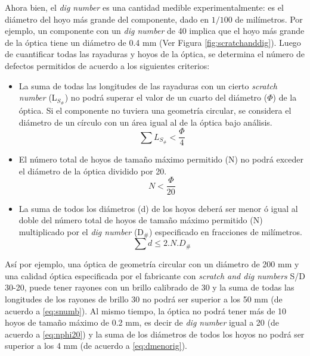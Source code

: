 Ahora bien, el \textit{dig number} es una cantidad medible experimentalmente: es el diámetro del hoyo más grande del componente, dado en $1/100$ de milímetros. Por ejemplo, un componente con un \textit{dig number} de 40 implica que el hoyo más grande de la óptica tiene un diámetro de 0.4 mm (Ver Figura \ref{fig:scratchanddig}). Luego de cuantificar todas las rayaduras y hoyos de la óptica, se determina el número de defectos permitidos de acuerdo a los siguientes criterios:
\begin{itemize}
\item La suma de todas las longitudes de las rayaduras con un cierto \textit{scratch number} (L$_{S_{\#}}$) no podrá superar el valor de un cuarto del diámetro ($\Phi$) de la óptica. Si el componente no tuviera una geometría circular, se considera el diámetro de un círculo con un área igual al de la óptica bajo análisis.
\begin{equation}
\sum L_{S_{\#}} < \frac{\Phi}{4}
\label{eq:snumb}
\end{equation}
\item El número total de hoyos de tamaño máximo permitido (N) no podrá exceder el diámetro de la óptica dividido por 20.
\begin{equation}
N  <  \frac{\Phi}{20}
\label{eq:nphi20}
\end{equation}
\item La suma de todos los diámetros (d) de los hoyos deberá ser menor ó igual al doble del número total de hoyos de tamaño máximo permitido (N) multiplicado por el \textit{dig number} (D$_{\#}$) especificado en fracciones de milímetros.
\begin{equation}
\sum d 	\leq 2 . N . D_{\#}
\label{eq:dmenorig}
\end{equation}
\end{itemize}


Así por ejemplo, una óptica de geometría circular con un diámetro de 200 mm y una calidad óptica especificada por el fabricante con \textit{scratch and dig numbers} S/D 30-20, puede tener rayones con un brillo calibrado de 30 y la suma de todas las longitudes de los rayones de brillo 30 no podrá ser superior a los 50 mm (de acuerdo a \eqref{eq:snumb}). Al mismo tiempo, la óptica no podrá tener más de 10 hoyos de tamaño máximo de 0.2 mm, es decir de \textit{dig number} igual a 20 (de acuerdo a  \eqref{eq:nphi20}) y la suma de los diámetros de todos los hoyos no podrá ser superior a los 4 mm (de acuerdo a \eqref{eq:dmenorig}).

